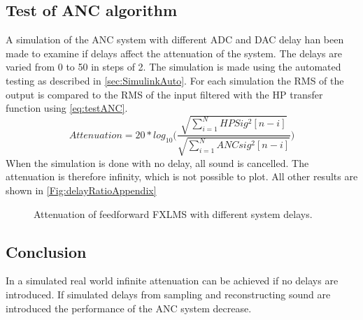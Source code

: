 
\subsection{Test of ANC algorithm}
A simulation of the ANC system with different ADC and DAC delay han been made to examine if delays affect the attenuation of the system. The delays are varied from 0 to 50 in steps of 2. The simulation is made using the automated testing as described in \autoref{sec:SimulinkAuto}. For each simulation the RMS of the output is compared to the RMS of the input filtered with the HP transfer function using \autoref{eq:testANC}.
\begin{equation}\label{eq:testANC}
		Attenuation=20*log_{10}\bigg(\frac{\sqrt{\sum\limits_{i=1}^{N}HPSig^2[n-i]}}{\sqrt{\sum\limits_{i=1}^{N}ANCsig^2[n-i]}}\bigg)
\end{equation}
When the simulation is done with no delay, all sound is cancelled. The attenuation is therefore infinity, which is not possible to plot. All other results are shown in \autoref{Fig:delayRatioAppendix}

\begin{figure}[H]
	\centering
	
	\caption{Attenuation of feedforward FXLMS with different system delays.}
	\label{Fig:delayRatioAppendix}
\end{figure}

\subsection{Conclusion}
In a simulated real world infinite attenuation can be achieved if no delays are introduced. If simulated delays from sampling and reconstructing sound are introduced the performance of the ANC system decrease.